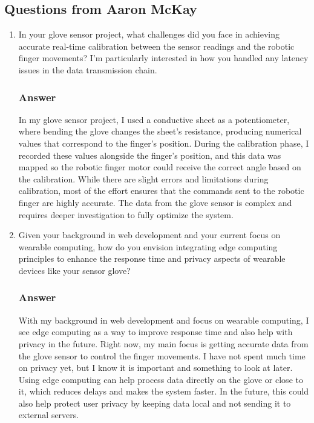 \subsection{Questions from Aaron McKay}
\begin{enumerate}
  \item In your glove sensor project, what challenges did you face in achieving accurate real-time calibration between the sensor readings and the robotic finger movements? I'm particularly interested in how you handled any latency issues in the data transmission chain.
  \subsubsection*{Answer}
  In my glove sensor project, I used a conductive sheet as a potentiometer, where bending the glove changes the sheet's resistance, producing numerical values that correspond to the finger's position. During the calibration phase, I recorded these values alongside the finger's position, and this data was mapped so the robotic finger motor could receive the correct angle based on the calibration. While there are slight errors and limitations during calibration, most of the effort ensures that the commands sent to the robotic finger are highly accurate. The data from the glove sensor is complex and requires deeper investigation to fully optimize the system.
  \item Given your background in web development and your current focus on wearable computing, how do you envision integrating edge computing principles to enhance the response time and privacy aspects of wearable devices like your sensor glove?
  
  \subsubsection*{Answer}
  With my background in web development and focus on wearable computing, I see edge computing as a way to improve response time and also help with privacy in the future. Right now, my main focus is getting accurate data from the glove sensor to control the finger movements. I have not spent much time on privacy yet, but I know it is important and something to look at later. Using edge computing can help process data directly on the glove or close to it, which reduces delays and makes the system faster. In the future, this could also help protect user privacy by keeping data local and not sending it to external servers.
\end{enumerate}

